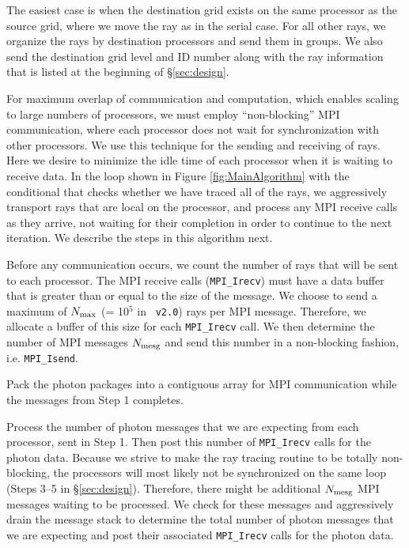 \documentclass[useAMS,usenatbib]{mn2e}
\begin{document}
The easiest case is when the destination grid exists on the same
processor as the source grid, where we move the ray as in the serial
case.  For all other rays, we organize the rays by destination
processors and send them in groups.  We also send the destination grid
level and ID number along with the ray information that is listed at
the beginning of \S\ref{sec:design}.

For maximum overlap of communication and computation, which enables
scaling to large numbers of processors, we must employ
``non-blocking'' MPI communication, where each processor does not wait
for synchronization with other processors.  We use this technique for
the sending and receiving of rays.  Here we desire to minimize the
idle time of each processor when it is waiting to receive data.  In
the loop shown in Figure \ref{fig:MainAlgorithm} with the conditional
that checks whether we have traced all of the rays, we aggressively
transport rays that are local on the processor, and process any MPI
receive calls as they arrive, not waiting for their completion in
order to continue to the next iteration.  We describe the steps in
this algorithm next.

 Before any communication occurs, we count the number of rays
that will be sent to each processor.  The MPI receive calls
(\texttt{MPI\_Irecv}) must have a data buffer that is greater than or
equal to the size of the message.  We choose to send a maximum of
$N_{\rm max}$ (= 10$^5$ in \enzo~\texttt{v2.0}) rays per MPI message.
Therefore, we allocate a buffer of this size for each
\texttt{MPI\_Irecv} call.  We then determine the number of MPI messages
$N_{\rm mesg}$ and send this number in a non-blocking fashion,
i.e. \texttt{MPI\_Isend}.

 Pack the photon packages into a contiguous array for MPI
communication while the messages from Step 1 completes.

 Process the number of photon messages that we are expecting
from each processor, sent in Step 1.  Then post this number of
\texttt{MPI\_Irecv} calls for the photon data.  Because we strive to
make the ray tracing routine to be totally non-blocking, the
processors will most likely not be synchronized on the same loop
(Steps 3--5 in \S\ref{sec:design}).  Therefore, there might be
additional $N_{\rm mesg}$ MPI messages waiting to be processed.  We
check for these messages and aggressively drain the message stack to
determine the total number of photon messages that we are expecting
and post their associated \texttt{MPI\_Irecv} calls for the photon
data.
\end{document}
